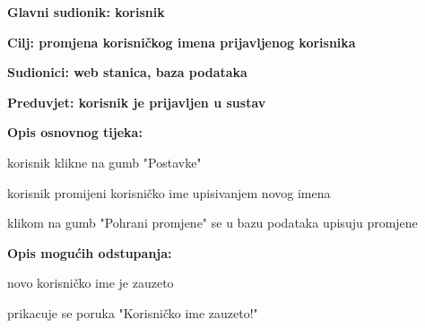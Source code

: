 				
					\noindent {}
					\begin{packed_item}
						\item \textbf{Glavni sudionik: korisnik}
						\item  \textbf{Cilj: promjena korisničkog imena prijavljenog korisnika}
						\item  \textbf{Sudionici: web stanica, baza podataka}
						\item  \textbf{Preduvjet: korisnik je prijavljen u sustav}
						
						\item  \textbf{Opis osnovnog tijeka:}
						\item[] \begin{packed_enum}
							\item korisnik klikne na gumb "Postavke"
							\item korisnik promijeni korisničko ime upisivanjem novog imena
							\item klikom na gumb "Pohrani promjene" se u bazu podataka upisuju promjene
						\end{packed_enum}
						
						\item  \textbf{Opis mogućih odstupanja:}
						\item[] \begin{packed_item}
							\item[2.a] novo korisničko ime je zauzeto
							\begin{packed_item}
								\item prikacuje se poruka "Korisničko ime zauzeto!"
							\end{packed_item}
						\end{packed_item}
					\end{packed_item}


